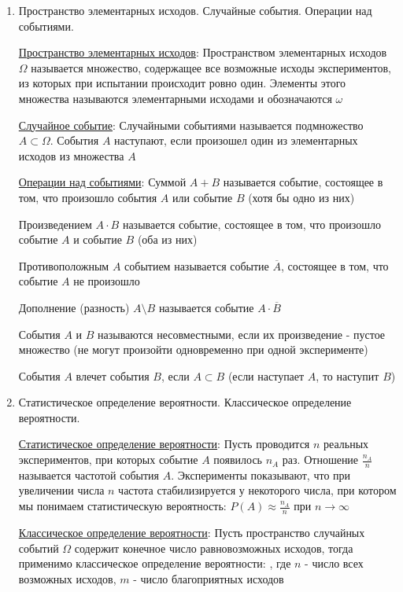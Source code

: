\documentclass[12pt]{article}
\begin{document}
\begin{enumerate}
    \item Пространство элементарных исходов. Случайные события. Операции над событиями.

    \hyperlink{spaceofelementaryoutcomes}{Пространство элементарных исходов}: Пространством элементарных исходов $\Omega$ называется множество, содержащее все возможные исходы
    экспериментов, из которых при испытании происходит ровно один. Элементы этого множества называются
    элементарными исходами и обозначаются $\omega$

    \hyperlink{randomeventdefinition}{Случайное событие}: Случайными событиями называется подмножество $A \subset \Omega$. События $A$ наступают, если произошел один из
    элементарных исходов из множества $A$

    \hyperlink{randomeventoperations}{Операции над событиями}: Суммой $A + B$ называется событие, состоящее в том, что произошло события $A$ или событие $B$ (хотя бы одно из них)

    Произведением $A \cdot B$ называется событие, состоящее в том, что произошло событие $A$ и событие $B$ (оба из них)

    Противоположным $A$ событием называется событие $\overline{A}$, состоящее в том, что событие $A$ не произошло

    Дополнение (разность) $A \setminus B$ называется событие $A \cdot \overline{B}$

    События $A$ и $B$ называются несовместными, если их произведение - пустое множество
    (не могут произойти одновременно при одной эксперименте)

    События $A$ влечет события $B$, если $A \subset B$ (если наступает $A$, то наступит $B$)

    \item Статистическое определение вероятности. Классическое определение вероятности.

    \hyperlink{statisticaldefinitionofprobability}{Статистическое определение вероятности}: Пусть проводится $n$ реальных экспериментов, при которых событие $A$ появилось $n_A$ раз.
    Отношение $\frac{n_A}{n}$ называется частотой события $A$.
    Эксперименты показывают, что при увеличении числа $n$ частота стабилизируется у некоторого числа,
    при котором мы понимаем статистическую вероятность: $P(A) \approx \frac{n_A}{n}$ при $n \to \infty$

    \hyperlink{classicdefinitionofprobability}{Классическое определение вероятности}: Пусть пространство случайных событий $\Omega$ содержит конечное число равновозможных исходов,
    тогда применимо классическое определение вероятности: , где $n$ - число всех возможных исходов, $m$ - число благоприятных исходов


\end{enumerate}
\end{document}
